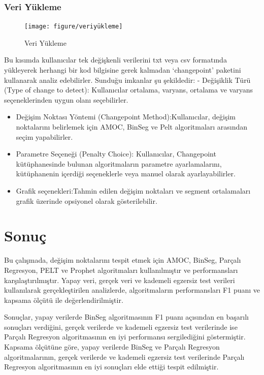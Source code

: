 \documentclass[12pt,twoside]{deuthesis}
\begin{document}
\subsection{Veri Yükleme}\label{veri-yuxfckleme}

\begin{figure}
\texttt{[image: figure/veriyükleme]} \caption{Veri Yükleme}\label{fig:unnamed-chunk-14}
\end{figure}

Bu kısımda kullanıcılar tek değişkenli verilerini txt veya csv formatında yükleyerek herhangi bir kod bilgisine gerek kalmadan `changepoint' paketini kullanarak analiz edebilirler. Sunduğu imkanlar şu şekildedir:
- Değişiklik Türü (Type of change to detect): Kullanıcılar ortalama, varyans, ortalama ve varyans seçeneklerinden uygun olanı seçebilirler.

\begin{itemize}
\item
  Değişim Noktası Yöntemi (Changepoint Method):Kullanıcılar, değişim noktalarını belirlemek için AMOC, BinSeg ve Pelt algoritmaları arasından seçim yapabilirler.
\item
  Parametre Seçeneği (Penalty Choice): Kullanıcılar, Changepoint kütüphanesinde bulunan algoritmaların parametre ayarlamalarını, kütüphanenin içerdiği seçeneklerle veya manuel olarak ayarlayabilirler.
\item
  Grafik seçenekleri:Tahmin edilen değişim noktaları ve segment ortalamaları grafik üzerinde opsiyonel olarak gösterilebilir.
\end{itemize}

\chapter{Sonuç}\label{sonuuxe7}

Bu çalışmada, değişim noktalarını tespit etmek için AMOC, BinSeg, Parçalı Regresyon, PELT ve Prophet algoritmaları kullanılmıştır ve performansları karşılaştırılmıştır. Yapay veri, gerçek veri ve kademeli egzersiz test verileri kullanılarak gerçekleştirilen analizlerde, algoritmaların performansları F1 puanı ve kapsama ölçütü ile değerlendirilmiştir.

Sonuçlar, yapay verilerde BinSeg algoritmasının F1 puanı açısından en başarılı sonuçları verdiğini, gerçek verilerde ve kademeli egzersiz test verilerinde ise Parçalı Regresyon algoritmasının en iyi performansı sergilediğini göstermiştir. Kapsama ölçütüne göre, yapay verilerde BinSeg ve Parçalı Regresyon algoritmalarının, gerçek verilerde ve kademeli egzersiz test verilerinde Parçalı Regresyon algoritmasının en iyi sonuçları elde ettiği tespit edilmiştir.
\end{document}
